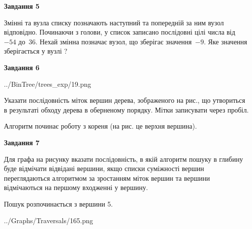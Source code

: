 \documentclass[12pt, ukrainian]{article}
\begin{document}
{\begin {large}
{\begin {center}\textbf{Завдання 5}\end {center}}\par
Змінні  та  вузла списку позначають наступний та попередній за ним вузол відповідно. Починаючи з голови, у список записано послідовні цілі числа від~$-54$ до~$36$. Нехай змінна  позначає вузол, що зберігає значення~$-9$.
Яке значення зберігається у вузлі  ?\par
\newpage

{\begin {center}\textbf{Завдання 6}\end {center}}\par

\begin{center}
	{../BinTree/trees_exp/19.png}
\end{center}
Указати послідовність міток вершин дерева, зображеного на рис., що утвориться в результаті обходу дерева в оберненому порядку. Мітки записувати через пробіл.\par Алгоритм починає роботу з кореня (на рис. це верхня вершина).\par
\newpage

{\begin {center}\textbf{Завдання 7}\end {center}}\par
Для графа на рисунку вказати послідовність, в якій алгоритм пошуку в глибину буде відмічати відвідані вершини, якщо списки суміжності вершин переглядаються алгоритмом за зростанням міток вершин та вершини відмічаються на першому вход\-женні у вершину.\par
Пошук розпочинається з вершини 5.\par

\begin{center}
	{../Graphs/Traversals/165.png}
\end{center}\par
\newpage


\end{large}}
\end{document}
